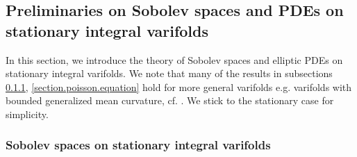 \documentclass[11pt]{amsart}
\newtheorem{lemma}[theorem]{Lemma}
\theoremstyle{definition}
\newcommand{\R}{\mathbb{R}}
\newcommand{\loc}{\mathrm{loc}}
\begin{document}



\subsection{Preliminaries on Sobolev spaces and PDEs on stationary integral varifolds}
In this section, we introduce the theory of Sobolev spaces and elliptic PDEs on stationary integral varifolds. We note that many of the results in subsections \ref{section.sobolev.space}, \ref{section.poisson.equation} hold for more general varifolds e.g. varifolds with bounded generalized mean curvature, cf. \cite{Me1sobolev,Me2weaklydifferentiable,MS}. We stick to the stationary case for simplicity.
\subsubsection{Sobolev spaces on stationary integral varifolds}\label{section.sobolev.space}
\end{document}
